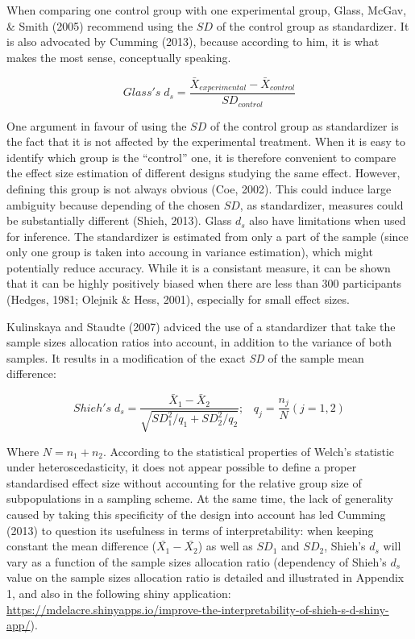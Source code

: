 \documentclass[
  man,floatsintext]{apa6}
\begin{document}
When comparing one control group with one experimental group, Glass, McGav, \& Smith (2005) recommend using the \(SD\) of the control group as standardizer. It is also advocated by Cumming (2013), because according to him, it is what makes the most sense, conceptually speaking.

\begin{equation} 
Glass's \; d_s = \frac{\bar{X}_{experimental} - \bar{X}_{control}}{SD_{control}}
\label{eq:Glassds}
\end{equation}

One argument in favour of using the \(SD\) of the control group as standardizer is the fact that it is not affected by the experimental treatment. When it is easy to identify which group is the \enquote{control} one, it is therefore convenient to compare the effect size estimation of different designs studying the same effect. However, defining this group is not always obvious (Coe, 2002). This could induce large ambiguity because depending of the chosen \(SD\), as standardizer, measures could be substantially diﬀerent (Shieh, 2013). Glass \(d_s\) also have limitations when used for inference. The standardizer is estimated from only a part of the sample (since only one group is taken into accoung in variance estimation), which might potentially reduce accuracy. While it is a consistant measure, it can be shown that it can be highly positively biased when there are less than 300 participants (Hedges, 1981; Olejnik \& Hess, 2001), especially for small effect sizes.

Kulinskaya and Staudte (2007) adviced the use of a standardizer that take the sample sizes allocation ratios into account, in addition to the variance of both samples. It results in a modification of the exact \emph{SD} of the sample mean difference:

\begin{equation} 
Shieh's \; d_s = \frac{\bar{X}_1 - \bar{X}_2}{\sqrt{SD_1^2/q_1+SD_2^2/q_2}}; \;\;\; q_j=\frac{n_j}{N} (j=1,2)
\label{eq:Shiehds}
\end{equation}

Where \(N = n_1+n_2\). According to the statistical properties of Welch's statistic under heteroscedasticity, it does not appear possible to define a proper standardised effect size without accounting for the relative group size of subpopulations in a sampling scheme. At the same time, the lack of generality caused by taking this specificity of the design into account has led Cumming (2013) to question its usefulness in terms of interpretability: when keeping constant the mean difference (\(\bar{X_1}-\bar{X_2}\)) as well as \(SD_1\) and \(SD_2\), Shieh's \(d_s\) will vary as a function of the sample sizes allocation ratio (dependency of Shieh's \(d_s\) value on the sample sizes allocation ratio is detailed and illustrated in Appendix 1, and also in the following shiny application: \url{https://mdelacre.shinyapps.io/improve-the-interpretability-of-shieh-s-d-shiny-app/}).
\end{document}
